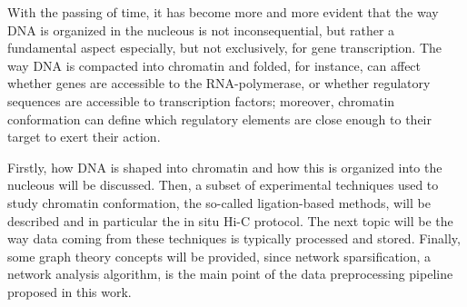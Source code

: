
With the passing of time, it has become more and more evident that the way DNA is organized in the nucleous is not inconsequential, but rather a fundamental aspect especially, but not exclusively, for gene transcription. The way DNA is compacted into chromatin and folded, for instance, can affect whether genes are accessible to the RNA-polymerase, or whether regulatory sequences are accessible to transcription factors; moreover, chromatin conformation can define which regulatory elements are close enough to their target to exert their action\cite{chromatinfiber2015,chromatinorganization2019}.

Firstly, how DNA is shaped into chromatin and how this is organized into the nucleous will be discussed. Then, a subset of experimental techniques used to study chromatin conformation, the so-called ligation-based methods, will be described and in particular the in situ Hi-C protocol. The next topic will be the way data coming from these techniques is typically processed and stored. Finally, some graph theory concepts will be provided, since network sparsification, a network analysis algorithm, is the main point of the data preprocessing pipeline proposed in this work.

